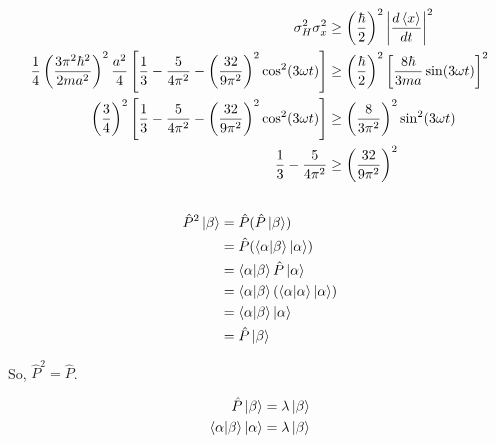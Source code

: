 \documentclass{article}
\begin{document}
\begin{align*}
  \sigma_H^2 \sigma_x^2                                                                                                                                                               & \ge \left( \frac{\hbar}{2} \right)^2 \left| \frac{d \braket{x}}{d t} \right|^2                \\
  \frac{1}{4} \left( \frac{3 \pi^2 \hbar^2}{2 m a^2} \right)^2 \frac{a^2}{4} \left[ \frac{1}{3} - \frac{5}{4 \pi^2} - \left( \frac{32}{9 \pi^2} \right)^2 \cos^2 (3 \omega t) \right] & \ge \left( \frac{\hbar}{2} \right)^2 \left[ \frac{8 \hbar}{3 m a} \sin (3 \omega t) \right]^2 \\
  \left( \frac{3}{4} \right)^2 \left[ \frac{1}{3} - \frac{5}{4 \pi^2} - \left( \frac{32}{9 \pi^2} \right)^2 \cos^2 (3 \omega t) \right]                                               & \ge \left( \frac{8}{3 \pi^2} \right)^2 \sin^2 (3 \omega t)                                    \\
  \frac{1}{3} - \frac{5}{4 \pi^2}                                                                                                                                                     & \ge \left( \frac{32}{9 \pi^2} \right)^2
\end{align*}

\setcounter{subsection}{22}
\subsection{}

\begin{align*}
  \hat{P}^2 \ket{\beta} & = \hat{P} (\hat{P} \ket{\beta})                                   \\
                        & = \hat{P} (\braket{\alpha | \beta} \ket{\alpha})                  \\
                        & = \braket{\alpha | \beta} \hat{P} \ket{\alpha}                    \\
                        & = \braket{\alpha | \beta} (\braket{\alpha | \alpha} \ket{\alpha}) \\
                        & = \braket{\alpha | \beta} \ket{\alpha}                            \\
                        & = \hat{P} \ket{\beta}
\end{align*}

So, $\hat{P}^2 = \hat{P}$.

\begin{align*}
  \hat{P} \ket{\beta}                  & = \lambda \ket{\beta} \\
  \braket{\alpha | \beta} \ket{\alpha} & = \lambda \ket{\beta}
\end{align*}
\end{document}

